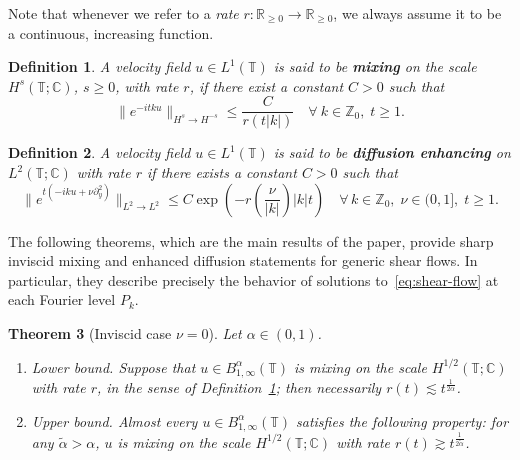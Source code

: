 \documentclass[11pt,oneside,reqno]{amsart}
\newcommand{\tmdfn}[1]{\textbf{#1}}
\newcommand{\tmtextit}[1]{{{\itshape{#1}}}}
\newenvironment{enumeratealpha}{\begin{enumerate}[a{\textup{)}}] }{\end{enumerate}}
\newtheorem{theorem}{Theorem}[section]
\newtheorem{definition}[theorem]{Definition}
\numberwithin{equation}{section}
\begin{document}
Note that whenever we refer to a \tmtextit{rate} $r : \mathbb{R}_{\geqslant
0} \rightarrow \mathbb{R}_{\geqslant 0}$, we always assume it to be a
continuous, increasing function.

\begin{definition}
  \label{def:mixing}A velocity field $u \in L^1 (\mathbb{T})$ is said to be
  {\tmdfn{mixing}} on the scale $H^s (\mathbb{T}; \mathbb{C})$, $s \geqslant
  0$, with rate $r$, if there exist a constant $C > 0$ such that
  \begin{equation}
    \| e^{- i t k u} \|_{H^s \rightarrow H^{- s}} \leqslant \frac{C}{r (t | k
    |)}  \quad \forall \: k \in \mathbb{Z}_0, \; t \geqslant 1.
    \label{eq:def-mixing}
  \end{equation}
\end{definition}

\begin{definition}
  \label{def:diffusion-enhancing}A velocity field $u \in L^1 (\mathbb{T})$ is
  said to be {\tmdfn{diffusion enhancing}} on $L^2 (\mathbb{T}; \mathbb{C})$
  with rate $r$ if there exists a constant $C > 0$ such that
  \begin{equation}
    \| e^{t (- i k u + \nu \partial_y^2)} \|_{L^2 \rightarrow L^2} \leqslant C
    \exp \left( - r \left( \frac{\nu}{| k |} \right) | k | t \right)  \quad
    \forall \, k \in \mathbb{Z}_0, \; \nu \in (0, 1], \; t \geqslant 1.
    \label{eq:def-enhancing}
  \end{equation}
\end{definition}

The following theorems, which are the main results of the paper, provide sharp
inviscid mixing and enhanced diffusion statements for generic shear flows. In
particular, they describe precisely the behavior of solutions
to~\eqref{eq:shear-flow} at each Fourier level $P_k$.

\begin{theorem}[Inviscid case $\nu = 0$]
  \label{thm:main-thm-inviscid}Let $\alpha \in (0, 1)$.
  \begin{enumeratealpha}
    \item Lower bound. Suppose that $u \in B^{\alpha}_{1, \infty}
    (\mathbb{T})$ is mixing on the scale $H^{1 / 2} (\mathbb{T}; \mathbb{C})$
    with rate $r$, in the sense of Definition~\ref{def:mixing}; then
    necessarily $r (t) \lesssim t^{\frac{1}{2 \alpha}}$.
    
    \item Upper bound. Almost every $u \in B^{\alpha}_{1, \infty}
    (\mathbb{T})$ satisfies the following property: for any $\tilde{\alpha} >
    \alpha$, $u$ is mixing on the scale $H^{1 / 2} (\mathbb{T}; \mathbb{C})$
    with rate $r (t) \gtrsim t^{\frac{1}{2 \tilde{\alpha}}}$.
  \end{enumeratealpha}
\end{theorem}
\end{document}
